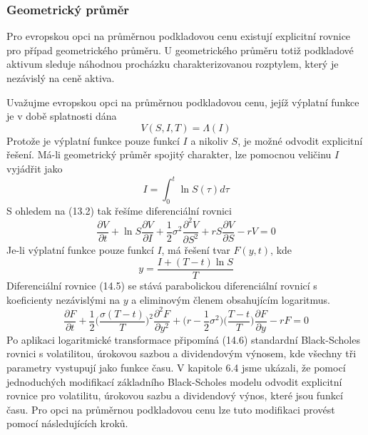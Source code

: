 \documentclass[a4paper]{book}
\begin{document}
\subsubsection{Geometrický průměr}

Pro evropskou opci na průměrnou podkladovou cenu existují explicitní rovnice pro případ geometrického průměru. U geometrického průměru totiž podkladové aktivum sleduje náhodnou procházku charakterizovanou rozptylem, který je nezávislý na ceně aktiva.

Uvažujme evropskou opci na průměrnou podkladovou cenu, jejíž výplatní funkce je v době splatnosti dána
\begin{equation*}
V(S,I,T) = \Lambda(I)
\end{equation*}
Protože je výplatní funkce pouze funkcí $I$ a nikoliv $S$, je možné odvodit explicitní řešení. Má-li geometrický průměr spojitý charakter, lze pomocnou veličinu $I$ vyjádřit jako
\begin{equation*}
I = \int_0^t \ln S(\tau) d \tau
\end{equation*}
S ohledem na (13.2) tak řešíme diferenciální rovnici
\begin{equation}
\frac{\partial V}{\partial t} + \ln S \frac{\partial V}{\partial I} + \frac{1}{2} \sigma^2 \frac{\partial^2 V}{\partial S^2} + r S \frac{\partial V}{\partial S} - rV = 0
\end{equation}
Je-li výplatní funkce pouze funkcí $I$, má řešení tvar $F(y,t)$, kde
\begin{equation*}
y = \frac{I + (T - t) \ln S}{T}
\end{equation*}
Diferenciální rovnice (14.5) se stává parabolickou diferenciální rovnicí s koeficienty nezávislými na $y$ a eliminovým členem obsahujícím logaritmus.
\begin{equation}
\frac{\partial F}{\partial t} + \frac{1}{2}\Big( \frac{\sigma(T - t)}{T} \Big)^2 \frac{\partial^2 F}{\partial y^2} + \Big( r - \frac{1}{2}\sigma^2 \Big) \Big( \frac{T - t}{T} \Big)\frac{\partial F}{\partial y} - rF = 0
\end{equation}
Po aplikaci logaritmické transformace připomíná (14.6) standardní Black-Scholes rovnici s volatilitou, úrokovou sazbou a dividendovým výnosem, kde všechny tři parametry vystupují jako funkce času. V kapitole 6.4 jsme ukázali, že pomocí jednoduchých modifikací základního Black-Scholes modelu odvodit explicitní rovnice pro volatilitu, úrokovou sazbu a dividendový výnos, které jsou funkcí času. Pro opci na průměrnou podkladovou cenu lze tuto modifikaci provést pomocí následujících kroků.
\end{document}
